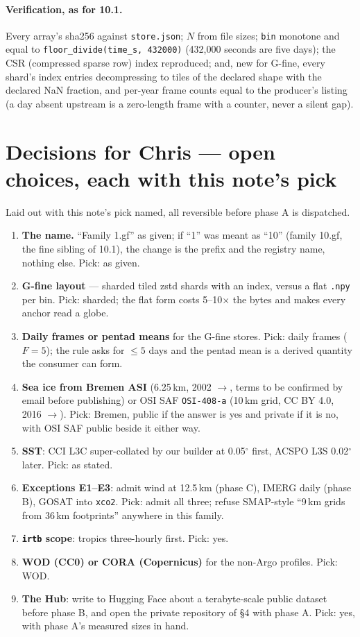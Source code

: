 \documentclass[10pt]{article}
\newcommand{\code}[1]{\texttt{#1}}
\begin{document}
\paragraph{Verification, as for 10.1.} Every array's sha256 against
\code{store.json}; $N$ from file sizes; \code{bin} monotone and equal to
\code{floor\_divide(time\_s, 432000)} (432,000 seconds are five days); the CSR (compressed sparse row) index reproduced; and, new for
G-fine, every shard's index entries decompressing to tiles of the declared
shape with the declared NaN fraction, and per-year frame counts equal to the
producer's listing (a day absent upstream is a zero-length frame with a
counter, never a silent gap).

\section{Decisions for Chris --- open choices, each with this note's pick}

Laid out with this note's pick named, all reversible before phase A is
dispatched.
\begin{enumerate}\itemsep2pt
\item \textbf{The name.} ``Family 1.gf'' as given; if ``1'' was meant as
``10'' (family 10.gf, the fine sibling of 10.1), the change is the prefix and
the registry name, nothing else. Pick: as given.
\item \textbf{G-fine layout} --- sharded tiled zstd shards with an index,
versus a flat \code{.npy} per bin. Pick: sharded; the flat form costs
5--10$\times$ the bytes and makes every anchor read a globe.
\item \textbf{Daily frames or pentad means} for the G-fine stores. Pick:
daily frames ($F = 5$); the rule asks for $\le 5$ days and the pentad mean is
a derived quantity the consumer can form.
\item \textbf{Sea ice from Bremen ASI} (6.25\,km, 2002 $\to$, terms to be
confirmed by email before publishing) or OSI SAF \code{OSI-408-a} (10\,km grid,
CC BY 4.0, 2016 $\to$). Pick: Bremen, public if the answer is yes and private if it
is no, with OSI SAF public beside it either way.
\item \textbf{SST}: CCI L3C super-collated by our builder at 0.05$^\circ$
first, ACSPO L3S 0.02$^\circ$ later. Pick: as stated.
\item \textbf{Exceptions E1--E3}: admit wind at 12.5\,km (phase C), IMERG
daily (phase B), GOSAT into \code{xco2}. Pick: admit all three; refuse
SMAP-style ``9\,km grids from 36\,km footprints'' anywhere in this family.
\item \textbf{\code{irtb} scope}: tropics three-hourly first. Pick: yes.
\item \textbf{WOD (CC0) or CORA (Copernicus)} for the non-Argo profiles.
Pick: WOD.
\item \textbf{The Hub}: write to Hugging Face about a terabyte-scale public
dataset before phase B, and open the private repository of \S4 with phase A.
Pick: yes, with phase A's measured sizes in hand.
\end{enumerate}
\end{document}
